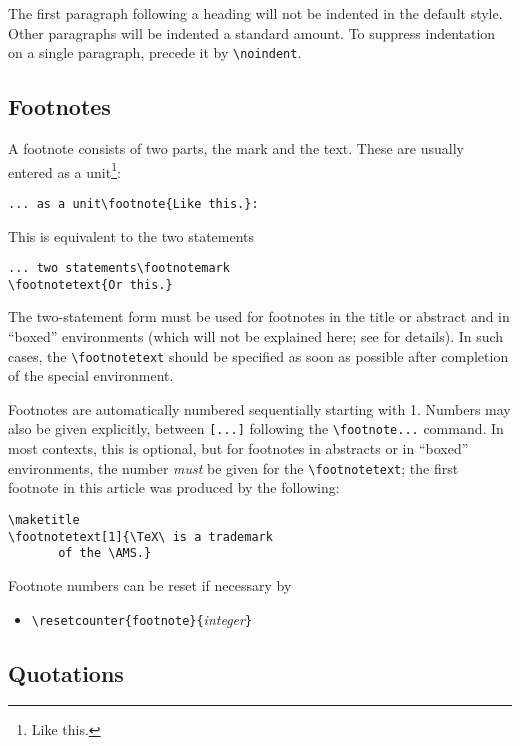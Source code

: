 The first paragraph following a heading will not be indented in the
default style.  Other paragraphs will be indented a standard amount.
To suppress indentation on a single paragraph, precede it by \verb"\noindent".

\subsection{Footnotes}

A footnote consists of two parts, the mark and the text.  These
are usually entered as a unit\footnote{Like this.}:
\begin{verbatim}
... as a unit\footnote{Like this.}:
\end{verbatim}
This is equivalent to the two statements\footnotemark
{}
\begin{verbatim}
... two statements\footnotemark
\footnotetext{Or this.}
\end{verbatim}
The two-statement form must be used for footnotes in the title or
abstract and in ``boxed'' environments
 (which will not be explained here; see
\cite{LT} for details).  In such cases, the \verb"\footnotetext" should
be specified as soon as possible after completion of the special
environment.

Footnotes are automatically numbered sequentially starting with 1.
Numbers may also be given explicitly, between \verb"[...]"
following the \verb"\footnote..." command.  In most contexts, this is
optional, but for footnotes in abstracts or in ``boxed'' environments,
the number {\sl must\/} be given for the \verb"\footnotetext"; the
first footnote in this article was produced by the following:
\begin{verbatim}
\maketitle
\footnotetext[1]{\TeX\ is a trademark
       of the \AMS.}
\end{verbatim}

Footnote numbers can be reset if necessary by
\begin{itemize}
\item[] \verb"\resetcounter{footnote}{"{\it integer\/}\verb"}"
\end{itemize}


\subsection{Quotations}

